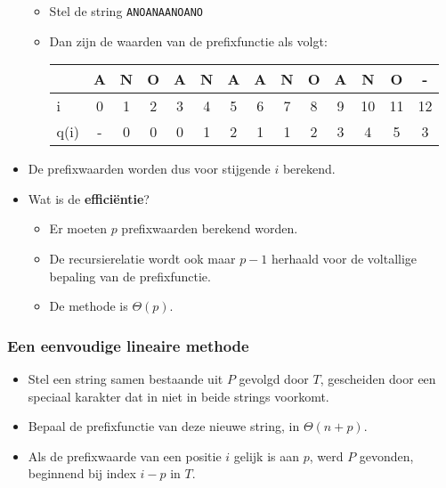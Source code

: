 \begin{itemize}
    \begin{itemize}
        \item Stel de string \texttt{ANOANAANOANO}
        \item Dan zijn de waarden van de prefixfunctie als volgt:
        \begin{table}[ht]
            \centering
            \begin{tabular}{l | c c c c c c c c c c c c c}
                     & A & N & O & A & N & A & A & N & O & A  & N  & O  & - \\
                     \hline
                i    & 0 & 1 & 2 & 3 & 4 & 5 & 6 & 7 & 8 & 9 & 10 & 11 & 12  \\
                q(i) & - & 0 & 0 & 0 & 1 & 2 & 1 & 1 & 2 & 3  & 4  & 5 & 3 
            \end{tabular}
        \end{table}
    \end{itemize}
    \item De prefixwaarden worden dus voor stijgende $i$ berekend.
    \item Wat is de \textbf{efficiëntie}?
    \begin{itemize}
        \item Er moeten $p$ prefixwaarden berekend worden.
        \item De recursierelatie wordt ook maar $p-1$ herhaald voor de voltallige bepaling van de prefixfunctie.
        \item De methode is $\Theta(p)$.
    \end{itemize}
\end{itemize}

\subsubsection{Een eenvoudige lineaire methode}
\begin{itemize}
    \item Stel een string samen bestaande uit $P$ gevolgd door $T$, gescheiden door een speciaal karakter dat in niet in beide strings voorkomt.
    \item Bepaal de prefixfunctie van deze nieuwe string, in $\Theta(n + p)$.
    \item Als de prefixwaarde van een positie $i$ gelijk is aan $p$, werd $P$ gevonden, beginnend bij index $i - p$ in $T$.
\end{itemize}


